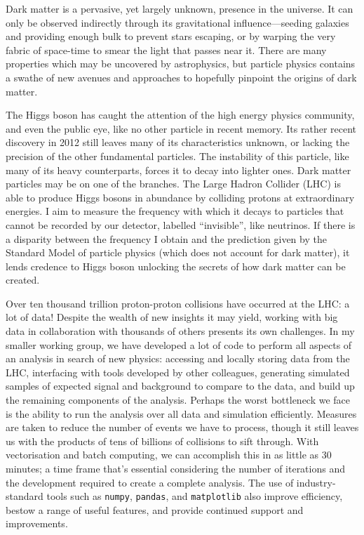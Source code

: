 
\begin{cvparagraph}
    Dark matter is a pervasive, yet largely unknown, presence in the universe. It can only be observed indirectly through its gravitational influence---seeding galaxies and providing enough bulk to prevent stars escaping, or by warping the very fabric of space-time to smear the light that passes near it. There are many properties which may be uncovered by astrophysics, but particle physics contains a swathe of new avenues and approaches to hopefully pinpoint the origins of dark matter.

    The Higgs boson has caught the attention of the high energy physics community, and even the public eye, like no other particle in recent memory. Its rather recent discovery in 2012 still leaves many of its characteristics unknown, or lacking the precision of the other fundamental particles. The instability of this particle, like many of its heavy counterparts, forces it to decay into lighter ones. Dark matter particles may be on one of the branches. The Large Hadron Collider (LHC) is able to produce Higgs bosons in abundance by colliding protons at extraordinary energies. I aim to measure the frequency with which it decays to particles that cannot be recorded by our detector, labelled ``invisible'', like neutrinos. If there is a disparity between the frequency I obtain and the prediction given by the Standard Model of particle physics (which does not account for dark matter), it lends credence to Higgs boson unlocking the secrets of how dark matter can be created.

    Over ten thousand trillion proton-proton collisions have occurred at the LHC: a lot of data! Despite the wealth of new insights it may yield, working with big data in collaboration with thousands of others presents its own challenges. In my smaller working group, we have developed a lot of code to perform all aspects of an analysis in search of new physics: accessing and locally storing data from the LHC, interfacing with tools developed by other colleagues, generating simulated samples of expected signal and background to compare to the data, and build up the remaining components of the analysis. Perhaps the worst bottleneck we face is the ability to run the analysis over all data and simulation efficiently. Measures are taken to reduce the number of events we have to process, though it still leaves us with the products of tens of billions of collisions to sift through. With vectorisation and batch computing, we can accomplish this in as little as 30 minutes; a time frame that's essential considering the number of iterations and the development required to create a complete analysis. The use of industry-standard tools such as \texttt{numpy}, \texttt{pandas}, and \texttt{matplotlib} also improve efficiency, bestow a range of useful features, and provide continued support and improvements.


\end{cvparagraph}
